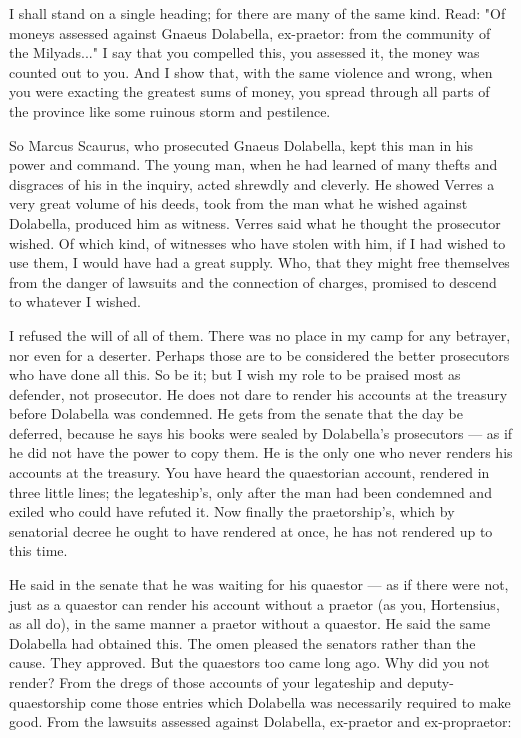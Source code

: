  I shall stand on a single heading; for there are many of the same kind. Read: "Of moneys assessed against Gnaeus Dolabella, ex-praetor: from the community of the Milyads..." I say that you compelled this, you assessed it, the money was counted out to you. And I show that, with the same violence and wrong, when you were exacting the greatest sums of money, you spread through all parts of the province like some ruinous storm and pestilence.

 So Marcus Scaurus, who prosecuted Gnaeus Dolabella, kept this man in his power and command. The young man, when he had learned of many thefts and disgraces of his in the inquiry, acted shrewdly and cleverly. He showed Verres a very great volume of his deeds, took from the man what he wished against Dolabella, produced him as witness. Verres said what he thought the prosecutor wished. Of which kind, of witnesses who have stolen with him, if I had wished to use them, I would have had a great supply. Who, that they might free themselves from the danger of lawsuits and the connection of charges, promised to descend to whatever I wished.

 I refused the will of all of them. There was no place in my camp for any betrayer, nor even for a deserter. Perhaps those are to be considered the better prosecutors who have done all this. So be it; but I wish my role to be praised most as defender, not prosecutor. He does not dare to render his accounts at the treasury before Dolabella was condemned. He gets from the senate that the day be deferred, because he says his books were sealed by Dolabella's prosecutors --- as if he did not have the power to copy them. He is the only one who never renders his accounts at the treasury. You have heard the quaestorian account, rendered in three little lines; the legateship's, only after the man had been condemned and exiled who could have refuted it. Now finally the praetorship's, which by senatorial decree he ought to have rendered at once, he has not rendered up to this time.

 He said in the senate that he was waiting for his quaestor --- as if there were not, just as a quaestor can render his account without a praetor (as you, Hortensius, as all do), in the same manner a praetor without a quaestor. He said the same Dolabella had obtained this. The omen pleased the senators rather than the cause. They approved. But the quaestors too came long ago. Why did you not render? From the dregs of those accounts of your legateship and deputy-quaestorship come those entries which Dolabella was necessarily required to make good. From the lawsuits assessed against Dolabella, ex-praetor and ex-propraetor:

